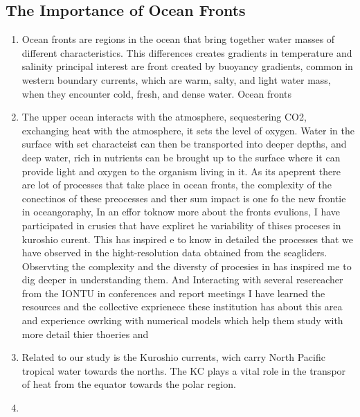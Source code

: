 \documentclass[letterpaper, 12pt ]{article}
\begin{document}
\subsection*{The Importance of Ocean Fronts}

\begin{enumerate}
    \item Ocean fronts are regions in the ocean that bring together water masses of different characteristics. This differences creates gradients in temperature and salinity principal interest are front created by buoyancy gradients, common in western boundary currents, which are warm, salty, and light water mass, when they encounter cold, fresh, and dense water. Ocean fronts   
    \item The upper ocean interacts with the atmosphere, sequestering CO2, exchanging heat with the atmosphere, it sets the level of oxygen. Water in the surface with set characteist can then be transported into deeper depths, and deep water, rich in nutrients can be brought up to the surface where it can provide light and oxygen to the organism living in it. As its apeprent there are lot of processes that take place in ocean fronts, the complexity of the conectinos of these preocesses and ther sum impact is one fo the new frontie in oceangoraphy, In an effor toknow more about the fronts evulions, I have participated in crusies that have expliret he variability of thises proceses in kuroshio curent. This has inspired e to  know in detailed the processes that we have observed in the hight-resolution data obtained from the seagliders. 
Observting the complexity and the diversty of procesies in has inspired me to dig deeper in understanding them. And Interacting with several resereacher from the IONTU in conferences and report meetings I have learned the resources and the collective exprienece these institution has about this area and experience owrking with numerical models which help them study with more detail thier thoeries and



    \item Related to our study is the Kuroshio currents, wich carry North Pacific tropical water towards the norths. The KC plays a vital role in the transpor of heat from the equator towards the polar region. 
    \item 
\end{enumerate}
\end{document}
